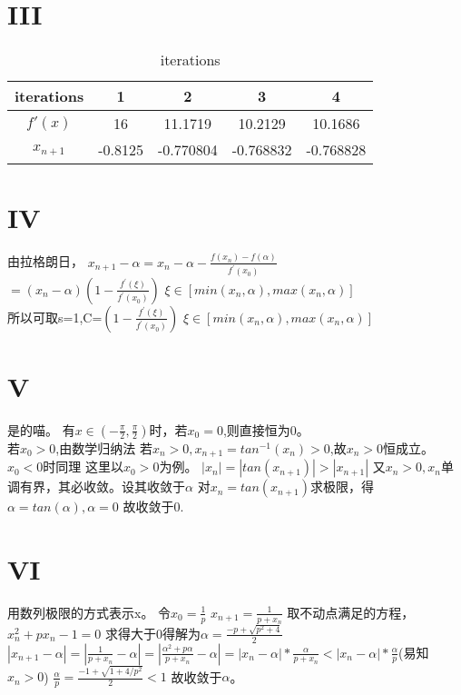 \documentclass[a4paper]{article}
\begin{document}
  \section*{III}
  \begin{flushleft}
    \begin{table}[htbp]
      \centering
      \caption{iterations}
      \begin{tabular}{|c|c|c|c|c|}
      \hline
      iterations & 1 & 2 & 3 & 4 \\ \hline
    \( f'(x) \) & 16 & 11.1719 & 10.2129 & 10.1686 \\ \hline
    \( x_{n+1} \) & -0.8125 & -0.770804 & -0.768832 & -0.768828 \\ \hline
      \end{tabular}
    \end{table}
  \end{flushleft}
  
  \section*{IV}
  \begin{flushleft}
    由拉格朗日，
    $x_{n+1}-\alpha=x_n-\alpha-\frac{f(x_n)-f(\alpha)}{f^{'}(x_0)}$\\
    $=(x_n-\alpha)(1-\frac{f^{'}(\xi)}{f^{'}(x_0)})$  $\xi \in [min(x_n,\alpha),max(x_n,\alpha)]$\\
    所以可取s=1,C=$(1-\frac{f^{'}(\xi)}{f^{'}(x_0)})$  $\xi \in [min(x_n,\alpha),max(x_n,\alpha)]$\\
    
  
  
  \end{flushleft}
  
  \section*{V}
  \begin{flushleft}
    是的喵。
    有$x \in (-\frac{\pi}{2},\frac{\pi}{2})$时，若$x_0=0$,则直接恒为0。\\
    若$x_0>0$,由数学归纳法 $若x_n>0,x_{n+1}=tan^{-1}(x_n)>0$,故$x_n>0$恒成立。$x_0<0$时同理
    这里以$x_0>0$为例。
    $|x_n|=|tan(x_{n+1})|>|x_{n+1}|$
    又$x_n>0,{x_n}$单调有界，其必收敛。设其收敛于$\alpha$
    对$x_n=tan(x_{n+1})$求极限，得$\alpha=tan(\alpha),\alpha=0$
    故收敛于0.
  \end{flushleft}
  
  \section*{VI}
  \begin{flushleft}
    用数列极限的方式表示x。
    令$x_0=\frac{1}{p}$
    $x_{n+1}=\frac{1}{p+x_n}$
    取不动点满足的方程，$x_n^2+px_n-1=0$
    求得大于0得解为$\alpha=\frac{-p+\sqrt{p^2+4}}{2}$
    $|x_{n+1}-\alpha|=|\frac{1}{p+x_n}-\alpha|=|\frac{\alpha^2+p\alpha}{p+x_n}-\alpha|=|x_n-\alpha|*\frac{\alpha}{p+x_n}<|x_n-\alpha|*\frac{\alpha}{p}$(易知$x_n>0$)
    $\frac{\alpha}{p}=\frac{-1+\sqrt{1+4/p^2}}{2}<1$
    故收敛于$\alpha$。
  
  \end{flushleft}
  
\end{document}
